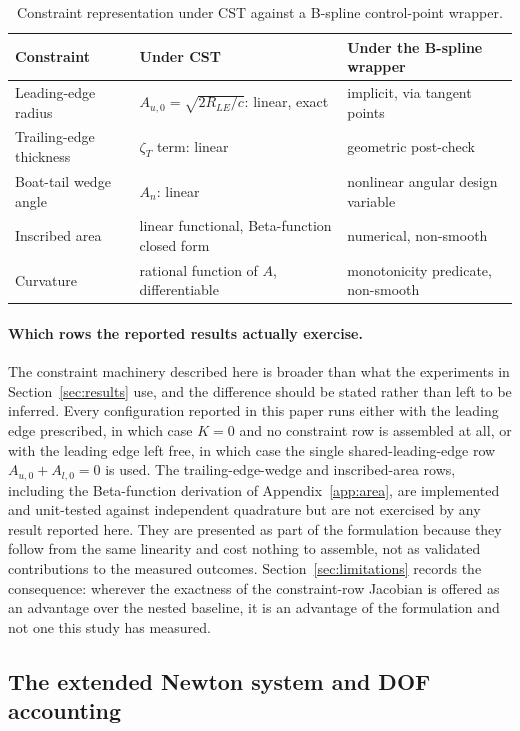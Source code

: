 \begin{table}[htbp]
\centering
\caption{Constraint representation under CST against a B-spline
control-point wrapper.}
\label{tab:constraint-comparison}
\footnotesize
\begin{tabularx}{\textwidth}{@{}l L L@{}}
\toprule
Constraint & Under CST & Under the B-spline wrapper \\
\midrule
Leading-edge radius & $A_{u,0}=\sqrt{2R_{LE}/c}$: linear, exact & implicit, via tangent points \\
Trailing-edge thickness & $\zeta_T$ term: linear & geometric post-check \\
Boat-tail wedge angle & $A_n$: linear & nonlinear angular design variable \\
Inscribed area & linear functional, Beta-function closed form & numerical, non-smooth \\
Curvature & rational function of $A$, differentiable & monotonicity predicate, non-smooth \\
\bottomrule
\end{tabularx}
\end{table}

\paragraph{Which rows the reported results actually exercise.} The constraint
machinery described here is broader than what the experiments in
Section~\ref{sec:results} use, and the difference should be stated rather than
left to be inferred. Every configuration reported in this paper runs either
with the leading edge prescribed, in which case $K=0$ and no constraint row is
assembled at all, or with the leading edge left free, in which case the single
shared-leading-edge row $A_{u,0}+A_{l,0}=0$ is used. The trailing-edge-wedge
and inscribed-area rows, including the Beta-function derivation of
Appendix~\ref{app:area}, are implemented and unit-tested against independent
quadrature but are not exercised by any result reported here. They are
presented as part of the formulation because they follow from the same
linearity and cost nothing to assemble, not as validated contributions to the
measured outcomes. Section~\ref{sec:limitations} records the consequence:
wherever the exactness of the constraint-row Jacobian is offered as an
advantage over the nested baseline, it is an advantage of the formulation and
not one this study has measured.

\subsection{The extended Newton system and DOF accounting}
\label{sec:newton-system}

